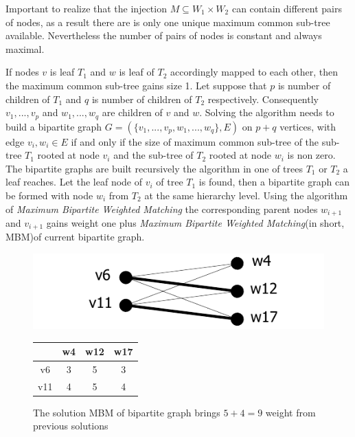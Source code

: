 \documentclass{report}
\begin{document}
Important to realize that the injection $M \subseteq W_{1} \times  W_{2}$ can contain different pairs of nodes, as a result there are is only one unique maximum common sub-tree available. Nevertheless the number of pairs of nodes is constant and always maximal.

If nodes $v$ is leaf $ T_{1}$ and $w$ is leaf of $T_{2 }$ accordingly mapped to each other, then the maximum common sub-tree gains size 1. Let suppose that $p$ is number of children of $ T_{1}$ and $q$ is number of children of $ T_{2}$ respectively. Consequently $ v_{1},...,v_{p}$ and $ w_{1},...,w_{q}$ are children of 
 $v$  and $w$\cite{valiente}. Solving the algorithm needs to build a bipartite graph $G=(\{v_{1},...,v_{p}, w_{1},...,w_{q} \}, E)$ on $p+q$ vertices, with edge 
$ v_{i},w_{i} \in E$  if and only if the size of maximum common sub-tree of the sub-tree $ T_{1}$ rooted at node $ v_{i}$ and the sub-tree of $T_{2 }$ rooted at node $ w_{i}$ is non zero\cite{valiente}. 
The bipartite graphs are built recursively the algorithm in one of trees $ T_{1}$ or $ T_{2}$ a leaf reaches. Let the leaf node of $ v_{i}$ of tree $ T_{1}$ is found, then a bipartite graph can be formed with node $ w_{i}$ from $ T_{2}$ at the same hierarchy level. Using the algorithm of \emph{Maximum Bipartite Weighted Matching} the corresponding parent nodes $ w_{i+1}$ and $ v_{i+1}$ gains weight one plus \emph{Maximum Bipartite Weighted Matching}(in short, MBM)of current bipartite graph.

\begin{figure}
  \begin{minipage}[h]{0.60\linewidth}
    \centering
    \includegraphics[scale=0.95]{Figures/algorithms/TD/1ex.pdf}\\[0.1cm]
  \end{minipage}%
  \begin{minipage}[b]{0.30\linewidth}
    \centering
\begin{tabular}{|c|c|c|c|}
\hline
    & w4 & w12                       & w17                       \\ \hline
v6  & 3  & \cellcolor[gray]{0.9} 5 & 3                         \\ \hline
v11 & 4  & 5                         & \cellcolor[gray]{0.9}4 \\ \hline
\end{tabular}
\end{minipage}
\caption[The final solution of bipartite matching]{The solution MBM of bipartite graph brings $5+4=9$ weight from previous solutions}
\label{fig:ex1}
\end{figure}
\end{document}
